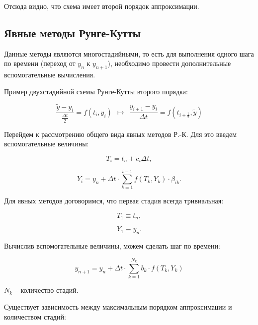\documentclass[10pt,a4paper]{article}
\begin{document}
	Отсюда видно, что схема имеет второй порядок аппроксимации.
	
	\subsection{Явные методы Рунге-Кутты}
	
		Данные методы являются многостадийными, то есть для выполнения одного 
		шага по времени (переход от $y_n$ к $y_{n+1}$), необходимо провести 
		дополнительные вспомогательные вычисления.
		
		Пример двухстадийной схемы Рунге-Кутты второго порядка:
		
		\begin{equation}\label{eq:rk_example}
			\frac{\widetilde{y} - y_{i}}{\frac{\Delta t}{2}} = f\left(t_{i}, 
			y_{i}\right)\ \ \mapsto \ \ \frac{y_{i + 1} - y_{i}}{\Delta t} = 
			f\left(t_{i + \frac{1}{2}}, \widetilde{y}\right)
		\end{equation}
		
		Перейдем к рассмотрению общего вида явных методов Р.-К. Для это введем 
		вспомогательные величины:
		
		\begin{equation}
			T_{i} = t_{n} + c_{i}\Delta t,
		\end{equation}
		
		\begin{equation}
			Y_{i} = y_{n} + \Delta t \cdot \sum\limits_{k = 1}^{i - 1}f\left(
			T_{k}, Y_{k}\right)\cdot \beta_{ik}.
		\end{equation}
		
		Для явных методов договоримся, что первая стадия всегда тривиальная:
		
		\begin{equation}
		T_{1} \equiv t_{n},
		\end{equation}
		
		\begin{equation}
		Y_{1} \equiv y_{n}.
		\end{equation}
		
		Вычислив вспомогательные величины, можем сделать шаг по времени:
		
		\begin{equation}
			y_{n + 1} = y_{n} + \Delta t\cdot \sum\limits_{k = 1}^{N_{k}}
			b_{k}\cdot f\left(T_{k}, Y_{k}\right)
		\end{equation}
		
		$N_{k}$ -- количество стадий.
		
		Существует зависимость между максимальным порядком аппроксимации и 
		количеством стадий:
		
\end{document}
